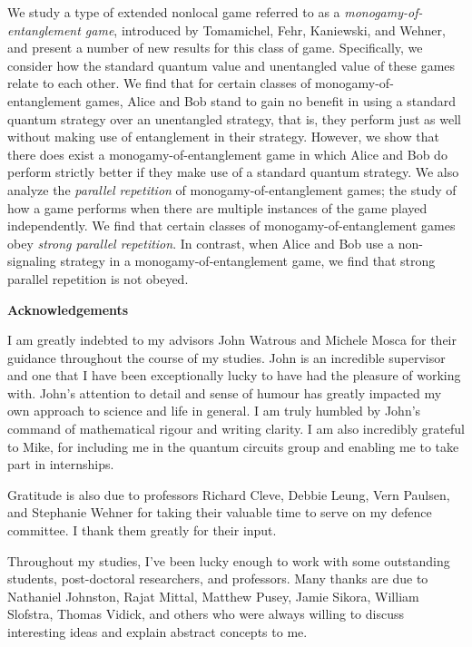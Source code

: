 We study a type of extended nonlocal game referred to as a \emph{monogamy-of-entanglement game}, introduced by Tomamichel, Fehr, Kaniewski, and Wehner, and present a number of new results for this class of game. Specifically, we consider how the standard quantum value and unentangled value of these games relate to each other. We find that for certain classes of monogamy-of-entanglement games, Alice and Bob stand to gain no benefit in using a standard quantum strategy over an unentangled strategy, that is, they perform just as well without making use of entanglement in their strategy. However, we show that there does exist a monogamy-of-entanglement game in which Alice and Bob do perform strictly better if they make use of a standard quantum strategy. We also analyze the \emph{parallel repetition} of monogamy-of-entanglement games; the study of how a game performs when there are multiple instances of the game played independently. We find that certain classes of monogamy-of-entanglement games obey \emph{strong parallel repetition}. In contrast, when Alice and Bob use a non-signaling strategy in a monogamy-of-entanglement game, we find that strong parallel repetition is not obeyed. 


\cleardoublepage
\newpage


\begin{center}\textbf{Acknowledgements}\end{center}

I am greatly indebted to my advisors John Watrous and Michele Mosca for their guidance throughout the course of my studies. John is an incredible supervisor and one that I have been exceptionally lucky to have had the pleasure of working with. John's attention to detail and sense of humour has greatly impacted my own approach to science and life in general. I am truly humbled by John's command of mathematical rigour and writing clarity. I am also incredibly grateful to Mike, for including me in the quantum circuits group and enabling me to take part in internships.      

Gratitude is also due to professors Richard Cleve, Debbie Leung, Vern Paulsen, and Stephanie Wehner for taking their valuable time to serve on my defence committee. I thank them greatly for their input. 

Throughout my studies, I've been lucky enough to work with some outstanding students, post-doctoral researchers, and professors. Many thanks are due to Nathaniel Johnston, Rajat Mittal, Matthew Pusey, Jamie Sikora, William Slofstra, Thomas Vidick, and others who were always willing to discuss interesting ideas and explain abstract concepts to me. 


